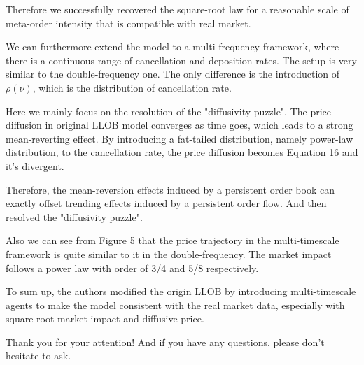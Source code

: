 \documentclass{article}
\begin{document}
Therefore we successfully recovered the square-root law for a reasonable scale of meta-order intensity that is compatible with real market. \newline

We can furthermore extend the model to a multi-frequency framework, where there is a continuous range of cancellation and deposition rates. The setup is very similar to the double-frequency one. The only difference is the introduction of $\rho(\nu)$, which is the distribution of cancellation rate. \newline

Here we mainly focus on the resolution of the "diffusivity puzzle". The price diffusion in original LLOB model converges as time goes, which leads to a strong mean-reverting effect. By introducing a fat-tailed distribution, namely power-law distribution, to the cancellation rate, the price diffusion becomes Equation 16 and it's divergent. \newline

Therefore, the mean-reversion effects induced by a persistent order book can exactly offset trending effects induced by a persistent order flow. And then resolved the "diffusivity puzzle". \newline

Also we can see from Figure 5 that the price trajectory in the multi-timescale framework is quite similar to it in the double-frequency. The market impact follows a power law with order of 3/4 and 5/8 respectively. \newline

To sum up, the authors modified the origin LLOB by introducing multi-timescale agents to make the model consistent with the real market data, especially with square-root market impact and diffusive price. \newline

Thank you for your attention! And if you have any questions, please don't hesitate to ask. \newline
\end{document}
